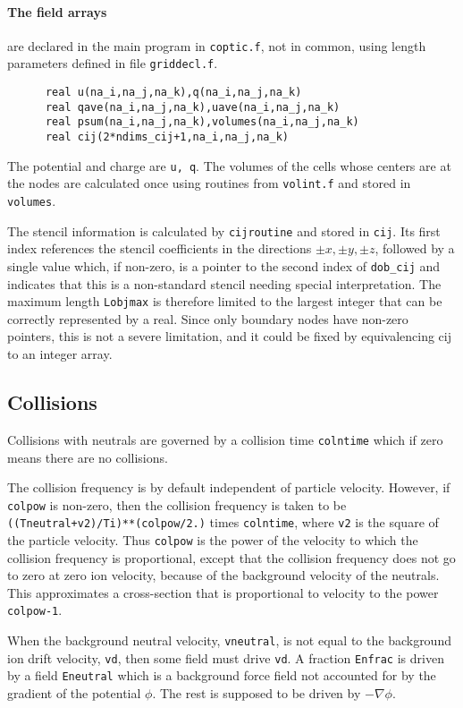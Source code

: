 \documentclass[12pt]{article}
\begin{document}
\paragraph{The field arrays} are declared in the main program in \verb!coptic.f!,
not in common, using length parameters defined in file \verb!griddecl.f!.
\begin{verbatim}
      real u(na_i,na_j,na_k),q(na_i,na_j,na_k)
      real qave(na_i,na_j,na_k),uave(na_i,na_j,na_k)
      real psum(na_i,na_j,na_k),volumes(na_i,na_j,na_k)
      real cij(2*ndims_cij+1,na_i,na_j,na_k)
\end{verbatim}
The potential and charge are \verb!u, q!. The volumes of the cells
whose centers are at the nodes are calculated once using routines from
\verb!volint.f! and stored in \verb!volumes!. 

The stencil information is calculated by \verb!cijroutine! and stored
in \verb!cij!. Its first index references the stencil coefficients in
the directions $\pm x, \pm y, \pm z$, followed by a single value
which, if non-zero, is a pointer to the second index of \verb!dob_cij!
and indicates that this is a non-standard stencil needing special
interpretation. The maximum length \verb!Lobjmax! is therefore limited
to the largest integer that can be correctly represented by a
real. Since only boundary nodes have non-zero pointers, this is not a
severe limitation, and it could be fixed by equivalencing cij to an
integer array.

\subsection{Collisions}

Collisions with neutrals are governed by a collision time
\verb!colntime! which if zero means there are no collisions.


The collision frequency is by default independent of particle
velocity. However, if \verb!colpow! is non-zero, then the collision
frequency is taken to be \verb!((Tneutral+v2)/Ti)**(colpow/2.)! times
\verb!colntime!, where \verb!v2! is the square of the particle
velocity. Thus \verb!colpow! is the power of the velocity to which the
collision frequency is proportional, except that the collision
frequency does not go to zero at zero ion velocity, because of the
background velocity of the neutrals. This approximates a cross-section
that is proportional to velocity to the power \verb!colpow-1!.

When the background neutral velocity, \verb!vneutral!, is not equal to
the background ion drift velocity, \verb!vd!, then some field must
drive \verb!vd!. A fraction \verb!Enfrac! is driven by a field
\verb!Eneutral! which is a background force field not accounted for by
the gradient of the potential $\phi$. The rest is supposed to be
driven by $-\nabla\phi$.
\end{document}

